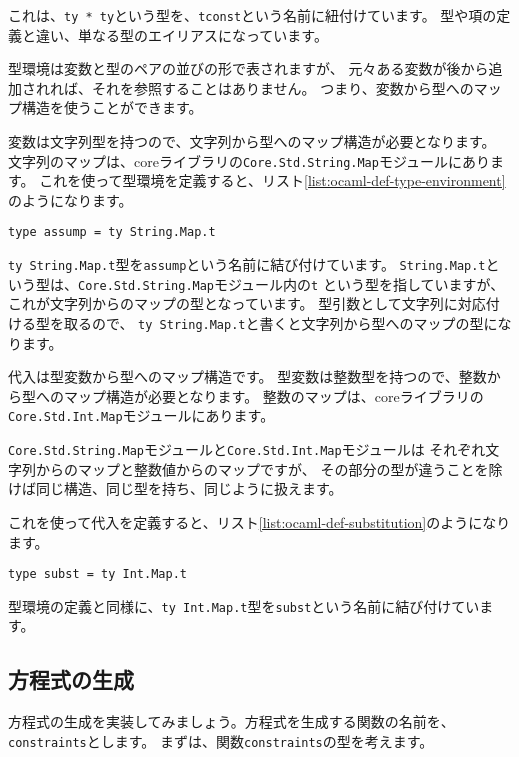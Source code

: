 これは、\texttt{ty * ty}という型を、\texttt{tconst}という名前に紐付けています。
型や項の定義と違い、単なる型のエイリアスになっています。

型環境は変数と型のペアの並びの形で表されますが、
元々ある変数が後から追加されれば、それを参照することはありません。
つまり、変数から型へのマップ構造を使うことができます。

変数は文字列型を持つので、文字列から型へのマップ構造が必要となります。
文字列のマップは、coreライブラリの\texttt{Core.Std.String.Map}モジュールにあります。
これを使って型環境を定義すると、リスト\ref{list:ocaml-def-type-environment}のようになります。

\begin{lstlisting}[caption=型環境の定義, label=list:ocaml-def-type-environment]
type assump = ty String.Map.t
\end{lstlisting}

\texttt{ty String.Map.t}型を\texttt{assump}という名前に結び付けています。
\texttt{String.Map.t}という型は、\texttt{Core.Std.String.Map}モジュール内の\texttt{t}
という型を指していますが、これが文字列からのマップの型となっています。
型引数として文字列に対応付ける型を取るので、
\texttt{ty String.Map.t}と書くと文字列から型へのマップの型になります。

代入は型変数から型へのマップ構造です。
型変数は整数型を持つので、整数から型へのマップ構造が必要となります。
整数のマップは、coreライブラリの\texttt{Core.Std.Int.Map}モジュールにあります。

\texttt{Core.Std.String.Map}モジュールと\texttt{Core.Std.Int.Map}モジュールは
それぞれ文字列からのマップと整数値からのマップですが、
その部分の型が違うことを除けば同じ構造、同じ型を持ち、同じように扱えます。

これを使って代入を定義すると、リスト\ref{list:ocaml-def-substitution}のようになります。

\begin{lstlisting}[caption=代入の定義, label=list:ocaml-def-substitution]
type subst = ty Int.Map.t
\end{lstlisting}

型環境の定義と同様に、\texttt{ty Int.Map.t}型を\texttt{subst}という名前に結び付けています。

\subsection{方程式の生成}

方程式の生成を実装してみましょう。方程式を生成する関数の名前を、\texttt{constraints}とします。
まずは、関数\texttt{constraints}の型を考えます。

